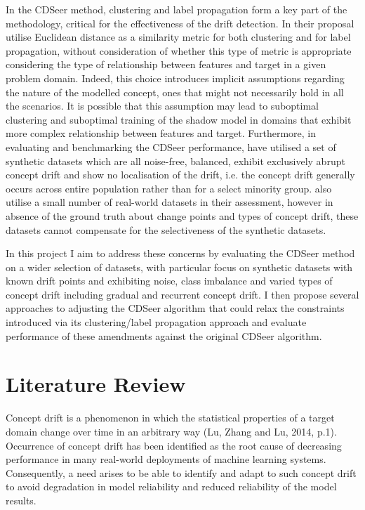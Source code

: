 \documentclass{svproc}
\begin{document}
    In the CDSeer method, clustering and label propagation form a key part of the methodology, critical for the effectiveness of the drift detection. In their proposal \cite{pham2025} utilise Euclidean distance as a similarity metric for both clustering and for label propagation, without consideration of whether this type of metric is appropriate considering the type of relationship between features and target in a given problem domain. Indeed, this choice introduces implicit assumptions regarding the nature of the modelled concept, ones that might not necessarily hold in all the scenarios. It is possible that this assumption may lead to suboptimal clustering and suboptimal training of the shadow model in domains that exhibit more complex relationship between features and target. Furthermore, in evaluating and benchmarking the CDSeer performance, \cite{pham2025} have utilised a set of synthetic datasets which are all noise-free, balanced, exhibit exclusively abrupt concept drift and show no localisation of the drift, i.e. the concept drift generally occurs across entire population rather than for a select minority group. \cite{pham2025} also utilise a small number of real-world datasets in their assessment, however in absence of the ground truth about change points and types of concept drift, these datasets cannot compensate for the selectiveness of the synthetic datasets.
    
    
    In this project I aim to address these concerns by evaluating the CDSeer method on a wider selection of datasets, with particular focus on synthetic datasets with known drift points and exhibiting noise, class imbalance and varied types of concept drift including gradual and recurrent concept drift. I then propose several approaches to adjusting the CDSeer algorithm that could relax the constraints introduced via its clustering/label propagation approach and evaluate performance of these amendments against the original CDSeer algorithm.
    
    
\section{Literature Review}

Concept drift is a phenomenon in which the statistical properties of a target domain change over time in an arbitrary way (Lu, Zhang and Lu, 2014, p.1). Occurrence of concept drift has been identified as the root cause of decreasing performance in many real-world deployments of machine learning systems. Consequently, a need arises to be able to identify and adapt to such concept drift to avoid degradation in model reliability and reduced reliability of the model results.
\end{document}
